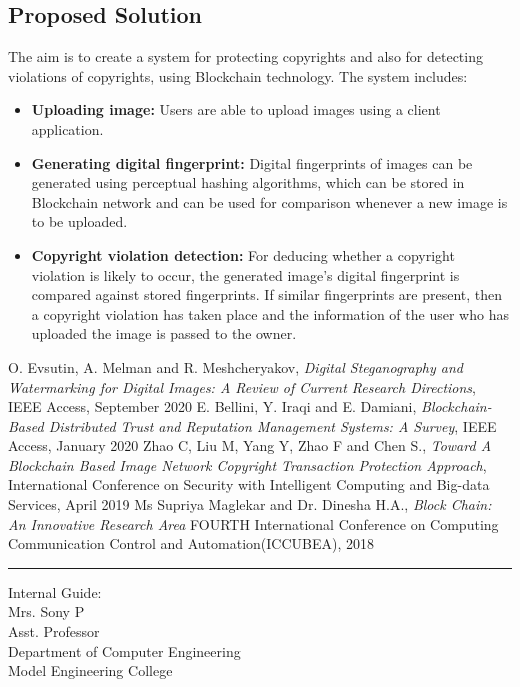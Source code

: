 \documentclass[10pt]{article}
\begin{document}
\subsection{Proposed Solution}
The aim is to create a system for protecting copyrights and also for detecting violations of copyrights, using Blockchain technology. The system includes: 
\begin{itemize}
   \item \textbf{Uploading image:} Users are able to upload images using a client application.
   \item \textbf{Generating digital fingerprint:} Digital fingerprints of images can be generated using perceptual hashing algorithms, which can be stored in Blockchain network and can be used for comparison whenever a new image is to be uploaded. 
   \item \textbf{Copyright violation detection:} For deducing whether a copyright violation is likely to occur, the generated image’s digital fingerprint is compared against stored fingerprints. If similar fingerprints are present, then a copyright violation has taken place and the information of the user who has uploaded the image is passed to the owner.
\end{itemize}
\begin{thebibliography}{9}
\bibitem{} O. Evsutin, A. Melman and R. Meshcheryakov, \emph{Digital Steganography and Watermarking for \quad Digital Images: A Review of Current Research Directions}, IEEE Access, September 2020
\bibitem{} E. Bellini, Y. Iraqi and E. Damiani, \emph{Blockchain-Based Distributed Trust and Reputation Management Systems: A Survey}, IEEE Access, January 2020
\bibitem{} Zhao C, Liu M, Yang Y, Zhao F and Chen S., \emph{Toward A Blockchain Based Image Network Copyright Transaction Protection Approach}, International Conference on Security with Intelligent Computing and Big-data Services, April 2019
\bibitem{} Ms Supriya Maglekar and Dr. Dinesha H.A., \emph{Block Chain: An Innovative Research Area} FOURTH International Conference on Computing Communication Control and Automation(ICCUBEA), 2018

\end{thebibliography}

\hrule
\vspace{.2in}
\begin{flushleft}
Internal Guide:
\vspace{.3in}
\\Mrs. Sony P
\\Asst. Professor
\\Department of Computer Engineering 
\\Model Engineering College 
\end{flushleft}
\end{document}
